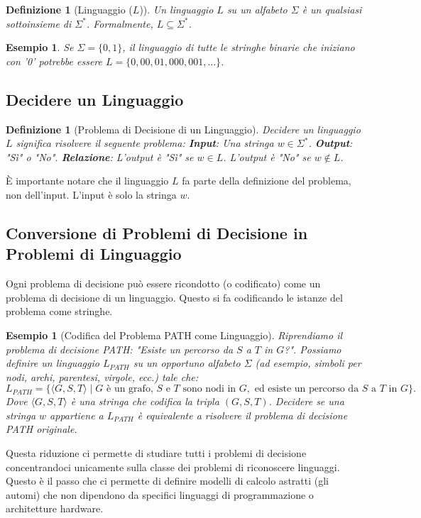\documentclass[a4paper, 11pt]{book} %
\newtheorem{definition}[theorem]{Definizione}
\newtheorem{example}[theorem]{Esempio}
\theoremstyle{definition}
\begin{document}
\begin{definition}[Linguaggio ($L$)]
Un linguaggio $L$ su un alfabeto $\Sigma$ è un qualsiasi sottoinsieme di $\Sigma^*$.
Formalmente, $L \subseteq \Sigma^*$.
\end{definition}
\begin{example}
Se $\Sigma = \{0, 1\}$, il linguaggio di tutte le stringhe binarie che iniziano con '0' potrebbe essere $L = \{0, 00, 01, 000, 001, \ldots\}$.
\end{example}

\subsection{Decidere un Linguaggio}

\begin{definition}[Problema di Decisione di un Linguaggio]
Decidere un linguaggio $L$ significa risolvere il seguente problema:
\textbf{Input}: Una stringa $w \in \Sigma^*$.
\textbf{Output}: "Sì" o "No".
\textbf{Relazione}: L'output è "Sì" se $w \in L$. L'output è "No" se $w \notin L$.
\end{definition}
È importante notare che il linguaggio $L$ fa parte della definizione del problema, non dell'input. L'input è solo la stringa $w$.

\subsection{Conversione di Problemi di Decisione in Problemi di Linguaggio}
Ogni problema di decisione può essere ricondotto (o codificato) come un problema di decisione di un linguaggio. Questo si fa codificando le istanze del problema come stringhe.

\begin{example}[Codifica del Problema PATH come Linguaggio]
Riprendiamo il problema di decisione PATH: "Esiste un percorso da $S$ a $T$ in $G$?".
Possiamo definire un linguaggio $L_{PATH}$ su un opportuno alfabeto $\Sigma$ (ad esempio, simboli per nodi, archi, parentesi, virgole, ecc.) tale che:
\[L_{PATH} = \{ \langle G, S, T \rangle \mid G \text{ è un grafo, } S \text{ e } T \text{ sono nodi in } G, \text{ ed esiste un percorso da } S \text{ a } T \text{ in } G \}.\]
Dove $\langle G, S, T \rangle$ è una stringa che codifica la tripla $(G, S, T)$.
Decidere se una stringa $w$ appartiene a $L_{PATH}$ è equivalente a risolvere il problema di decisione PATH originale.
\end{example}
Questa riduzione ci permette di studiare tutti i problemi di decisione concentrandoci unicamente sulla classe dei problemi di riconoscere linguaggi. Questo è il passo che ci permette di definire modelli di calcolo astratti (gli automi) che non dipendono da specifici linguaggi di programmazione o architetture hardware.
\end{document}
